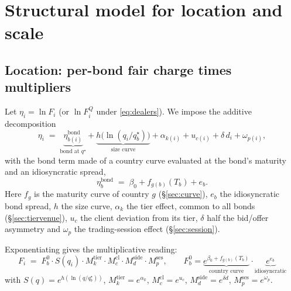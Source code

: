 \documentclass[11pt,a4paper]{article}
\theoremstyle{definition}
\theoremstyle{remark}
\begin{document}
\section{Structural model for location and scale}\label{sec:location}

\subsection{Location: per-bond fair charge times multipliers}
Let $\eta_i=\ln F_i$ (or $\ln F^Q_i$ under \eqref{eq:dealers}). We impose the additive decomposition
\begin{equation}\label{eq:eta}
\eta_i \;=\; \underbrace{\eta^{\mathrm{bond}}_{b(i)}}_{\text{bond at }q^\star}
+ \underbrace{h\bigl(\ln(q_i/q^\star_{b})\bigr)}_{\text{size curve}}
+ \alpha_{k(i)} + u_{c(i)} + \delta\,d_i + \omega_{p(i)},
\end{equation}
with the bond term made of a country curve evaluated at the bond's maturity and an idiosyncratic spread,
\begin{equation}\label{eq:bond}
\eta^{\mathrm{bond}}_b \;=\; \beta_0 + f_{g(b)}(T_b) + e_b .
\end{equation}
Here $f_g$ is the maturity curve of country $g$ (\S\ref{sec:curve}), $e_b$ the idiosyncratic bond spread, $h$ the size curve, $\alpha_k$ the tier effect, common to all bonds (\S\ref{sec:tiervenue}), $u_c$ the client deviation from its tier, $\delta$ half the bid/offer asymmetry and $\omega_p$ the trading-session effect (\S\ref{sec:session}).

Exponentiating gives the multiplicative reading:
\begin{equation}\label{eq:multiplicative}
\boxed{\;
F_i \;=\; F^{0}_{b}\cdot S(q_i)\cdot M^{\mathrm{tier}}_{k}\cdot M^{\mathrm{cl}}_{c}\cdot M^{\mathrm{side}}_{d}\cdot M^{\mathrm{ses}}_{p},
\qquad
F^0_b=\underbrace{e^{\beta_0+f_{g(b)}(T_b)}}_{\text{country curve}}\cdot\underbrace{e^{e_b}}_{\text{idiosyncratic}}
\;}
\end{equation}
with $S(q)=e^{h(\ln(q/q^\star_b))}$, $M^{\mathrm{tier}}_k=e^{\alpha_k}$, $M^{\mathrm{cl}}_c=e^{u_c}$, $M^{\mathrm{side}}_d=e^{\delta d}$, $M^{\mathrm{ses}}_p=e^{\omega_p}$.
\end{document}
